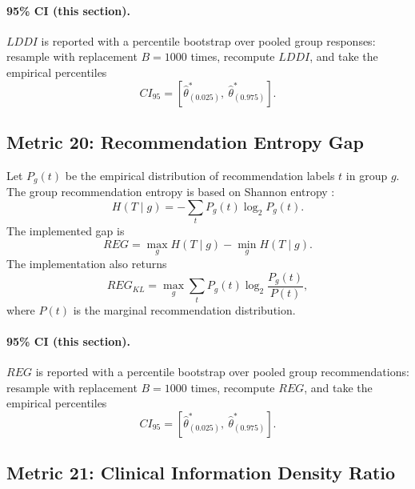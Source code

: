 \documentclass[11pt]{article}
\begin{document}
\paragraph{95\% CI (this section).} $LDDI$ is reported with a percentile bootstrap over pooled group responses: resample with replacement $B=1000$ times, recompute $LDDI$, and take the empirical percentiles
\begin{equation}
CI_{95}=\left[\hat\theta^{\ast}_{(0.025)},\ \hat\theta^{\ast}_{(0.975)}\right].
\end{equation}

\subsection{Metric 20: Recommendation Entropy Gap}

Let $P_g(t)$ be the empirical distribution of recommendation labels $t$ in group
$g$. The group recommendation entropy is based on Shannon entropy
\cite{shannon1948}:
\begin{equation}
H(T\mid g)=-\sum_t P_g(t)\log_2 P_g(t).
\end{equation}
The implemented gap is
\begin{equation}
REG=\max_g H(T\mid g)-\min_g H(T\mid g).
\end{equation}
The implementation also returns
\begin{equation}
REG_{KL}=\max_g \sum_t P_g(t)\log_2\frac{P_g(t)}{P(t)},
\end{equation}
where $P(t)$ is the marginal recommendation distribution.


\paragraph{95\% CI (this section).} $REG$ is reported with a percentile bootstrap over pooled group recommendations: resample with replacement $B=1000$ times, recompute $REG$, and take the empirical percentiles
\begin{equation}
CI_{95}=\left[\hat\theta^{\ast}_{(0.025)},\ \hat\theta^{\ast}_{(0.975)}\right].
\end{equation}

\subsection{Metric 21: Clinical Information Density Ratio}
\end{document}
